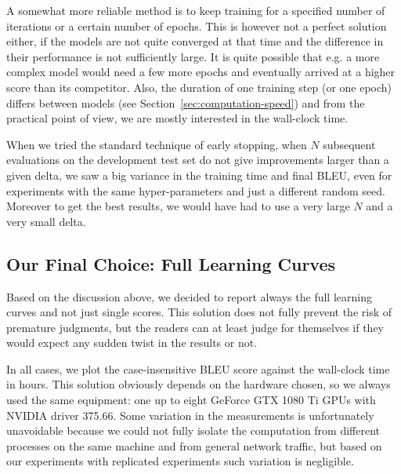 \documentclass{pbmlarxiv} \pdfoutput=1
\def\Sref#1{Section~\ref{#1}}
\begin{document}
A somewhat more reliable method is to keep training for a specified number of iterations
 or a certain number of epochs.
This is however not a perfect solution either, if the models are not quite
converged at that time and the difference in their performance is not
sufficiently large. It is quite possible that e.g. a more complex model would
need a few more epochs and eventually arrived at a higher score than its
competitor.
Also, the duration of one training step (or one epoch) differs between models
 (see \Sref{sec:computation-speed}) and from the practical point of view,
 we are mostly interested in the wall-clock time.

When we tried the standard technique of early stopping,
when $N$ subsequent evaluations on the development test set do not give
improvements larger than a given delta,
we saw a big variance in the training time and final BLEU,
even for experiments with the same hyper-parameters and just a different random
seed.
Moreover to get the best results, we would have had to use a very large $N$ and
a very small delta.

\subsection{Our Final Choice: Full Learning Curves}
Based on the discussion above, we decided to report always the full learning curves
 and not just single scores.
This solution does not fully prevent the risk of premature judgments,
 but the readers can at least judge for themselves
 if they would expect any sudden twist in the results or not.

In all cases, we plot the case-insensitive BLEU score against the wall-clock time in hours.
This solution obviously depends on the hardware chosen,
 so we always used the same equipment:
 one up to eight GeForce GTX 1080 Ti GPUs with NVIDIA driver 375.66.
Some variation in the measurements is unfortunately unavoidable
 because we could not fully isolate the computation
 from different processes on the same machine and from general network traffic,
 but based on our experiments with replicated experiments
 such variation is negligible.

\end{document}
